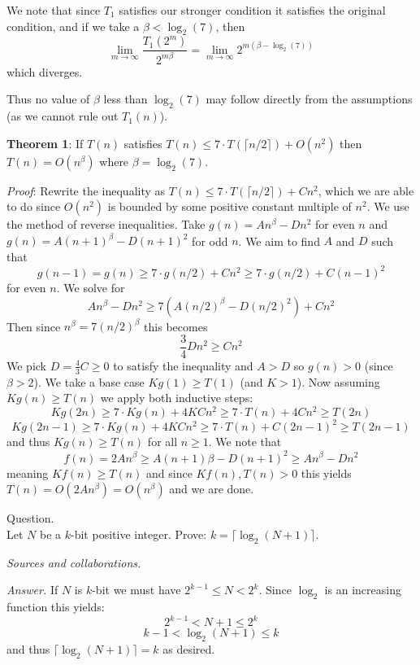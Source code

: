 \documentclass{amsart}
\begin{document}
\medskip \noindent We note that since $T_1$ satisfies our stronger condition it satisfies the original condition, and if we take a $\beta<\log_2(7)$, then \[\lim_{m\to\infty} \frac{T_1(2^m)}{2^{m\beta}}= \lim_{m\to\infty}2^{m(\beta-\log_2(7))}\] which diverges.

\medskip \noindent Thus no value of $\beta$ less than $\log_2(7)$ may follow directly from the assumptions (as we cannot rule out $T_1(n)$). 

\medskip \noindent \textbf{Theorem 1}: If $T(n)$ satisfies $T(n)\leq 7\cdot T(\lceil n/2\rceil)+ O(n^2)$ then $T(n)= O(n^\beta)$ where $\beta=\log_2(7)$.


\medskip \noindent \emph{Proof}:
Rewrite the inequality as $T(n)\leq 7\cdot T(\lceil n/2\rceil)+Cn^2$, which we are able to do since $O(n^2)$ is bounded by some positive constant multiple of $n^2$.
We use the method of reverse inequalities. Take $g(n)= An^\beta-Dn^2$ for even $n$ and $g(n)=A(n+1)^\beta-D(n+1)^2$ for odd $n$.  
We aim to find $A$ and $D$ such that \[g(n-1)=g(n)\geq 7\cdot g(n/2)+Cn^2 \geq 7\cdot g(n/2)+C(n-1)^2\]
for even $n$. We solve for 
\[An^\beta-Dn^2\geq 7(A(n/2)^\beta-D(n/2)^2)+Cn^2\]
Then since $n^\beta=7(n/2)^\beta$ this becomes \[\frac{3}{4}Dn^2\geq Cn^2\]
We pick $D=\frac{4}{3}C\geq0$ to satisfy the inequality and $A>D$ so $g(n)>0$ (since $\beta>2$). We take a base case $Kg(1)\geq T(1)$ (and $K>1$). Now assuming $Kg(n)\geq T(n)$ we apply both inductive steps:
\[Kg(2n)\geq 7\cdot Kg(n)+4KCn^2\geq7\cdot T(n)+4Cn^2\geq T(2n)\]
\[Kg(2n-1)\geq 7\cdot Kg(n)+4KCn^2\geq 7\cdot T(n)+C(2n-1)^2\geq T(2n-1)\]
and thus $Kg(n)\geq T(n)$ for all $n\geq 1$. 
We note that \[f(n)=2An^\beta\geq A(n+1)\beta-D(n+1)^2\geq An^\beta-Dn^2\]
meaning $Kf(n)\geq T(n)$ and since $Kf(n), T(n)>0$ this yields $T(n) = O(2An^\beta)=O(n^\beta)$ and we are done.

\newpage
{}

 Question. \\
Let $N$ be a $k$-bit positive integer. Prove: $k=\lceil \log_2(N+1)\rceil$. 

\medskip \noindent
\emph{Sources and collaborations.}

\medskip \noindent 
\emph{Answer.}
If $N$ is $k$-bit we must have $2^{k-1}\leq N < 2^k$. Since $\log_2$ is an increasing function this yields:
\[2^{k-1}<N+1\leq 2^k\]
\[k-1 < \log_2(N+1)\leq k\]
and thus $\lceil\log_2(N+1)\rceil = k$ as desired.

\newpage
{}
\end{document}

